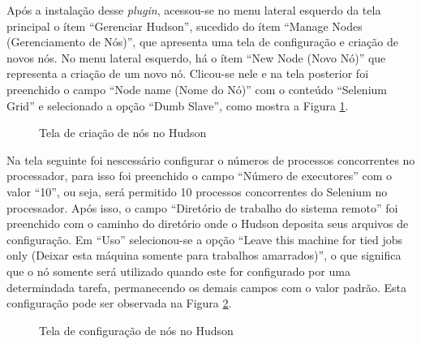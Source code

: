Após a instalação desse \textit{plugin}, acessou-se no menu lateral esquerdo da tela principal o ítem ``Gerenciar Hudson'', sucedido do ítem ``Manage Nodes (Gerenciamento de Nós)'', que apresenta uma tela de configuração e criação de novos nós. No menu lateral esquerdo, há o ítem ``New Node (Novo Nó)'' que representa a criação de um novo nó. Clicou-se nele e na tela posterior foi preenchido o campo ``Node name (Nome do Nó)'' com o conteúdo ``Selenium Grid'' e selecionado a opção ``Dumb Slave'', como mostra a Figura \ref{hudson_novo_no}.

\begin{figure}[ht]
    \centering
    \caption{Tela de criação de nós no Hudson}
    \label{hudson_novo_no}
\end{figure}

Na tela seguinte foi nescessário configurar o números de processos concorrentes no processador, para isso foi preenchido o campo ``Número de executores'' com o valor ``10'', ou seja, será permitido 10 processos concorrentes do Selenium no processador. Após isso, o campo ``Diretório de trabalho do sistema remoto'' foi preenchido com o caminho do diretório onde o Hudson deposita seus arquivos de configuração. Em ``Uso'' selecionou-se a opção ``Leave this machine for tied jobs only (Deixar esta máquina somente para trabalhos amarrados)'', o que significa que o nó somente será utilizado quando este for configurado por uma determindada tarefa, permanecendo os demais campos com o valor padrão. Esta configuração pode ser observada na Figura \ref{configuracao_no}.

\begin{figure}[ht]
    \centering
    \caption{Tela de configuração de nós no Hudson}
    \label{configuracao_no}
\end{figure}

